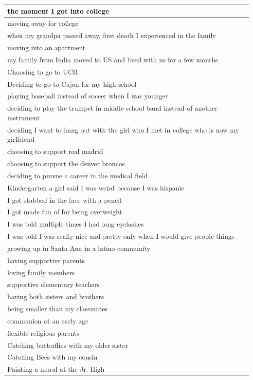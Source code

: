 \documentclass[
  .7em,
  letterpaper,
  DIV=11,
  numbers=noendperiod]{scrartcl}
\begin{document}
\begin{table}
\begin{tabular}{l}
\hline
the moment I got into college\\
\hline
moving away for college\\
\hline
when my grandpa passed away, first death I experienced in the family\\
\hline
moving into an apartment\\
\hline
my family from India moved to US and lived with us for a few months\\
\hline
Choosing to go to UCR\\
\hline
Deciding to go to Cajon for my high school\\
\hline
playing baseball instead of soccer when I was younger\\
\hline
deciding to play the trumpet in middle school band instead of another instrument\\
\hline
deciding I want to hang out with the girl who I met in college who is now my girlfriend\\
\hline
choosing to support real madrid\\
\hline
choosing to support the denver broncos\\
\hline
deciding to pursue a career in the medical field\\
\hline
Kindergarten a girl said I was weird because I was hispanic\\
\hline
I got stabbed in the face with a pencil\\
\hline
I got made fun of for being overweight\\
\hline
I was told multiple times I had long eyelashes\\
\hline
I was told I was really nice and pretty only when I would give people things\\
\hline
growing up in Santa Ana in a latino community\\
\hline
having supportive parents\\
\hline
loving family members\\
\hline
supportive elementary teachers\\
\hline
having both sisters and brothers\\
\hline
being smaller than my classmates\\
\hline
communion at an early age\\
\hline
flexible religious parents\\
\hline
Catching butterflies with my older sister\\
\hline
Catching Bees with my cousin\\
\hline
Painting a mural at the Jr. High\\

\end{tabular}
\end{table}
\end{document}
